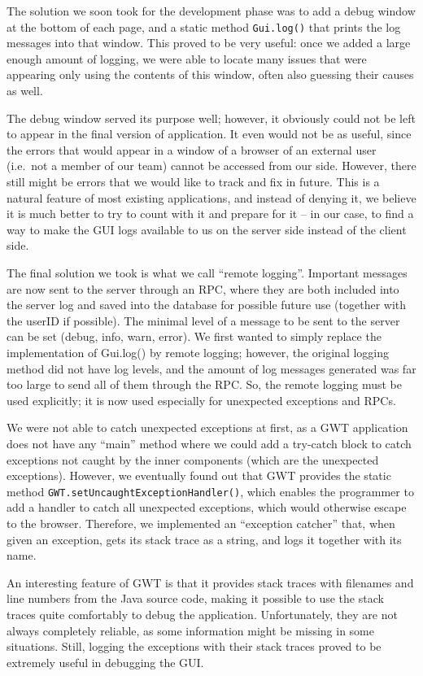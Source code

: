 The solution we soon took for the development phase was to add a debug window at the bottom of each page, and a static method {\tt Gui.log()} that prints the log messages into that window.
This proved to be very useful: once we added a large enough amount of logging, we were able to locate many issues that were appearing only using the contents of this window, often also guessing their causes as well.

The debug window served its purpose well; however, it obviously could not be left to appear in the final version of application.
It even would not be as useful, since the errors that would appear in a window of a browser of an external user (i.e.\ not a member of our team) cannot be accessed from our side.
However, there still might be errors that we would like to track and fix in future. This is a natural feature of most existing applications, and instead of denying it, we believe it is much better to try to count with it and prepare for it -- in our case, to find a way to make the GUI logs available to us on the server side instead of the client side.

The final solution we took is what we call ``remote logging''. Important messages are now sent to the server through an RPC, where they are both included into the server log and saved into the database for possible future use (together with the userID if possible).
The minimal level of a message to be sent to the server can be set (debug, info, warn, error).
We first wanted to simply replace the implementation of Gui.log() by remote logging; however, the original logging method did not have log levels, and the amount of log messages generated was far too large to send all of them through the RPC. So, the remote logging must be used explicitly; it is now used especially for unexpected exceptions and RPCs.

We were not able to catch unexpected exceptions at first, as a GWT application does not have any ``main'' method where we could add a try-catch block to catch exceptions not caught by the inner components (which are the unexpected exceptions).
However, we eventually found out that GWT provides the static method {\tt GWT.setUncaughtExceptionHandler()}, which enables the programmer to add a handler to catch all unexpected exceptions, which would otherwise escape to the browser.
Therefore, we implemented an ``exception catcher'' that, when given an exception, gets its stack trace as a string, and logs it together with its name.

An interesting feature of GWT is that it provides stack traces with filenames and line numbers from the Java source code, making it possible to use the stack traces quite comfortably to debug the application.
Unfortunately, they are not always completely reliable, as some information might be missing in some situations.
Still, logging the exceptions with their stack traces proved to be extremely useful in debugging the GUI.

